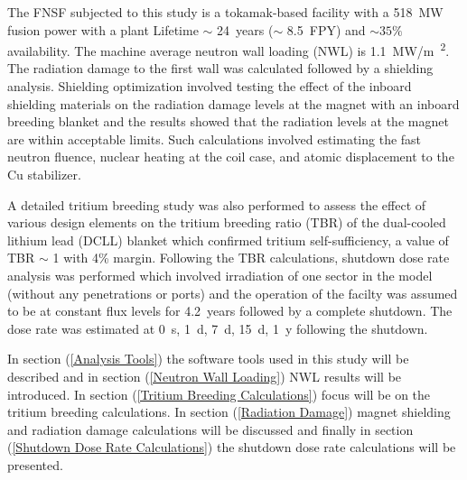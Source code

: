 \documentclass[12pt, letterpaper]{elsarticle}
\begin{document}
The FNSF subjected to this study is a tokamak-based facility with a \SI{518}{MW} fusion power with a plant Lifetime $\sim$ \SI{24}{years} ($\sim$ \SI{8.5}{FPY}) and $\sim 35\%$ availability. The machine average neutron wall loading (NWL) is \SI{1.1}{MW/m\textsuperscript{2}}. The radiation damage to the first wall was calculated followed by a shielding analysis. Shielding optimization \cite{ref_2} involved testing the effect of the inboard shielding materials on the radiation damage levels at the magnet with an inboard breeding blanket and the results showed that the radiation levels at the magnet are within acceptable limits. Such calculations involved estimating the fast neutron fluence, nuclear heating at the coil case, and atomic displacement to the Cu stabilizer.\vspace{5mm}

A detailed tritium breeding study was also performed to assess the effect of various design elements on the tritium breeding ratio (TBR) of the dual-cooled lithium lead (DCLL) blanket which confirmed tritium self-sufficiency, a value of TBR $\sim$ 1 with 4\% margin. Following the TBR calculations, shutdown dose rate analysis was performed which involved irradiation of one sector in the model (without any penetrations or ports) and the operation of the facilty was assumed to be at constant flux levels for \SI{4.2}{years} followed by a complete shutdown. The dose rate was estimated at \SI{0}{s}, \SI{1}{d}, \SI{7}{d}, \SI{15}{d}, \SI{1}{y} following the shutdown.\vspace{5mm}

In section (\ref{Analysis Tools}) the software tools used in this study will be described and in section (\ref{Neutron Wall Loading}) NWL results will be introduced. In section (\ref{Tritium Breeding Calculations}) focus will be on the tritium breeding calculations. In section (\ref{Radiation Damage}) magnet shielding and radiation damage calculations will be discussed and finally in section (\ref{Shutdown Dose Rate Calculations}) the shutdown dose rate calculations will be presented.
\end{document}
